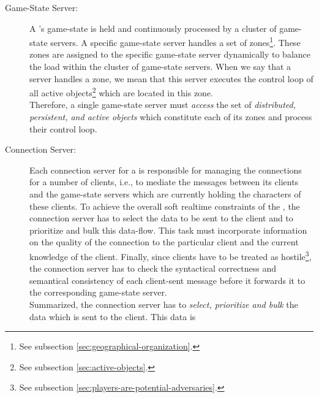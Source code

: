 \documentclass[a4paper, 10pt]{book}
\begin{document}
            \begin{description}
                \item[Game-State Server:] A \MMORG's game-state is held and
                    continuously processed by a cluster of game-state servers.
                    A specific game-state server handles a set of zones\footnote{See
                    subsection \vref{sec:geographical-organization}.}. These zones are
                    assigned to the specific game-state server dynamically to balance
                    the load within the cluster of game-state servers. When we say that
                    a server handles a zone, we mean that this server executes the
                    control loop of all active objects\footnote{See subsection
                    \vref{sec:active-objects}.} which are located in this zone.\\
                    Therefore, a single game-state server must \emph{access} the set of
                    \emph{distributed, persistent, and active objects} which constitute
                    each of its zones and process their control loop. 
                \item[Connection Server:] Each connection server for a \MMORG is
                    responsible for managing the connections for a number of clients,
                    i.e., to mediate the messages between its clients and the game-state
                    servers which are currently holding the characters of these clients.
                    To achieve the overall soft realtime constraints of the \MMORG, the
                    connection server has to select the data to be sent to the client
                    and to prioritize and bulk this data-flow. This task must
                    incorporate information on the quality of the connection to the
                    particular client and the current knowledge of the client.
                    Finally, since clients have to be treated as hostile\footnote{See
                    subsection \vref{sec:players-are-potential-adversaries}.}, the
                    connection server has to check the syntactical correctness
                    and semantical consistency of each client-sent message before it
                    forwards it to the corresponding game-state server.\\
                    Summarized, the connection server has to \emph{select, prioritize
                    and bulk} the data which is sent to the client. This data is

\end{description}
\end{document}
